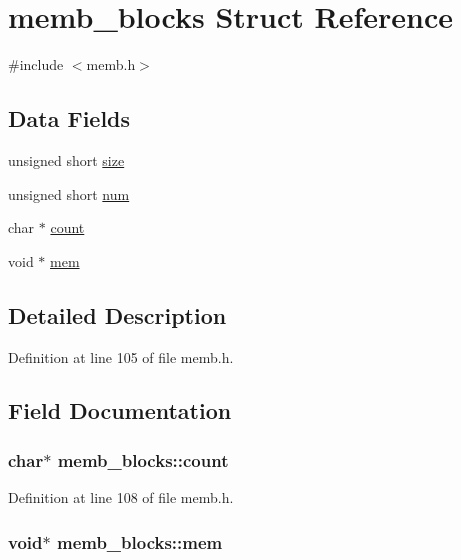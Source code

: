 \hypertarget{structmemb__blocks}{
\section{memb\_\-blocks Struct Reference}
\label{structmemb__blocks}
}


{\ttfamily \#include $<$memb.h$>$}

\subsection*{Data Fields}
\begin{DoxyCompactItemize}
\item 
unsigned short \hyperlink{structmemb__blocks_ab42c7af6114fde5d21206a2e18a7d3ee}{size}
\item 
unsigned short \hyperlink{structmemb__blocks_a164124d48fe85bc98d9a300382a5245d}{num}
\item 
char $\ast$ \hyperlink{structmemb__blocks_a5595902fd42d874e35a70206fad8f6d0}{count}
\item 
void $\ast$ \hyperlink{structmemb__blocks_ab5801722740492e69bcc73687476009f}{mem}
\end{DoxyCompactItemize}


\subsection{Detailed Description}


Definition at line 105 of file memb.h.



\subsection{Field Documentation}
\hypertarget{structmemb__blocks_a5595902fd42d874e35a70206fad8f6d0}{
\subsubsection[{count}]{\setlength{\rightskip}{0pt plus 5cm}char$\ast$ {\bf memb\_\-blocks::count}}}
\label{structmemb__blocks_a5595902fd42d874e35a70206fad8f6d0}


Definition at line 108 of file memb.h.

\hypertarget{structmemb__blocks_ab5801722740492e69bcc73687476009f}{
\subsubsection[{mem}]{\setlength{\rightskip}{0pt plus 5cm}void$\ast$ {\bf memb\_\-blocks::mem}}}
\label{structmemb__blocks_ab5801722740492e69bcc73687476009f}


